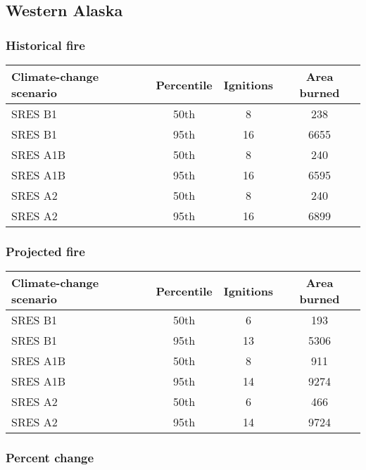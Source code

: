 \documentclass{article}\usepackage[]{graphicx}\usepackage[]{color}
\newcommand{\headcol}{\rowcolor{tableheadcolor}}
\begin{document}
\newpage
\pagebreak
\subsection{Western Alaska}
\subsubsection{Historical fire}

\begin{table}[ht]
\centering
\begin{tabular}{lccc}
  \headcol 
 \toprule
Climate-change scenario & Percentile & Ignitions & Area burned \\ 
  \midrule
SRES B1 & 50th & 8 & 238 \\ 
  SRES B1 & 95th & 16 & 6655 \\ 
  SRES A1B & 50th & 8 & 240 \\ 
  SRES A1B & 95th & 16 & 6595 \\ 
  SRES A2 & 50th & 8 & 240 \\ 
  SRES A2 & 95th & 16 & 6899 \\ 
   \bottomrule
\end{tabular}
\end{table}


\subsubsection{Projected fire}

\begin{table}[ht]
\centering
\begin{tabular}{lccc}
  \headcol 
 \toprule
Climate-change scenario & Percentile & Ignitions & Area burned \\ 
  \midrule
SRES B1 & 50th & 6 & 193 \\ 
  SRES B1 & 95th & 13 & 5306 \\ 
  SRES A1B & 50th & 8 & 911 \\ 
  SRES A1B & 95th & 14 & 9274 \\ 
  SRES A2 & 50th & 6 & 466 \\ 
  SRES A2 & 95th & 14 & 9724 \\ 
   \bottomrule
\end{tabular}
\end{table}


\subsubsection{Percent change}
\end{document}

